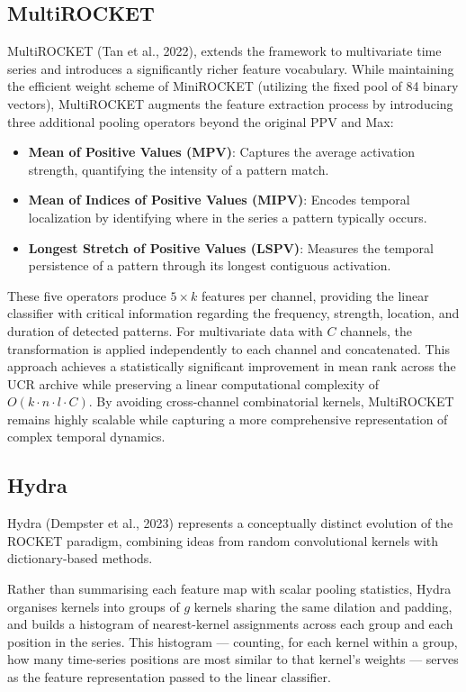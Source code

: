 \subsection{MultiROCKET}
MultiROCKET (Tan et al., 2022), extends the framework to multivariate time series and introduces a significantly richer feature vocabulary. While maintaining the efficient weight scheme of MiniROCKET (utilizing the fixed pool of 84 binary vectors), MultiROCKET augments the feature extraction process by introducing three additional pooling operators beyond the original PPV and Max:
\begin{itemize}
	\item \textbf{Mean of Positive Values (MPV)}: Captures the average activation strength, quantifying the intensity of a pattern match.
	\item \textbf{Mean of Indices of Positive Values (MIPV)}: Encodes temporal localization by identifying where in the series a pattern typically occurs.
	\item \textbf{Longest Stretch of Positive Values (LSPV)}: Measures the temporal persistence of a pattern through its longest contiguous activation.
\end{itemize}
These five operators produce $5\times k$ features per channel, providing the linear classifier with critical information regarding the frequency, strength, location, and duration of detected patterns. For multivariate data with $C$ channels, the transformation is applied independently to each channel and concatenated. This approach achieves a statistically significant improvement in mean rank across the UCR archive while preserving a linear computational complexity of $O(k\cdot n\cdot l\cdot C)$. By avoiding cross-channel combinatorial kernels, MultiROCKET remains highly scalable while capturing a more comprehensive representation of complex temporal dynamics.

\subsection{Hydra}
Hydra (Dempster et al., 2023) represents a conceptually distinct evolution of the ROCKET paradigm, combining ideas from random convolutional kernels with dictionary-based methods.

Rather than summarising each feature map with scalar pooling statistics, Hydra organises kernels into groups of $g$ kernels sharing the same dilation and padding, and builds a histogram of nearest-kernel assignments across each group and each position in the series. This histogram --- counting, for each kernel within a group, how many time-series positions are most similar to that kernel's weights --- serves as the feature representation passed to the linear classifier.

